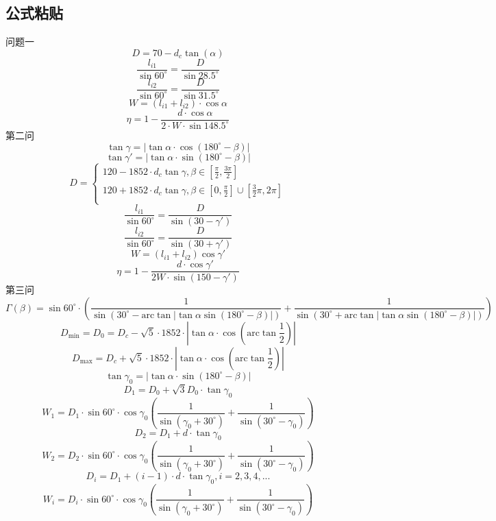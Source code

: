 \documentclass[withoutpreface,bwprint]{cumcmthesis} %
\begin{document}
\subsection{公式粘贴}
问题一
$$
D=70-d_c\tan \left( \alpha \right) 
$$ 
$$
\frac{l_{i1}}{\sin 60^{\circ}}=\frac{D}{\sin 28.5^{\circ}}
$$ 
$$
\frac{l_{i2}}{\sin 60^{\circ}}=\frac{D}{\sin 31.5^{\circ}}
$$ 
$$
W=\left( l_{i1}+l_{i2} \right) \cdot \cos \alpha 
$$ 
$$
\eta =1-\frac{d\cdot \cos \alpha}{2\cdot W\cdot \sin 148.5^{\circ}}
$$ 
第二问
$$
\tan \gamma =\left| \tan \alpha \cdot \cos \left( 180^{\circ}-\beta \right) \right|
$$ 
$$
\tan \gamma \prime=\left| \tan \alpha \cdot \sin \left( 180^{\circ}-\beta \right) \right|
$$ 
$$
D=\begin{cases}
	120-1852\cdot d_c\tan \gamma , \beta \in \left[ \frac{\pi}{2},\frac{3\pi}{2} \right]\\
	120+1852\cdot d_c\tan \gamma , \beta \in \left[ 0,\frac{\pi}{2} \right] \cup \left[ \frac{3}{2}\pi ,2\pi \right]\\
\end{cases}
$$ 
$$
\frac{l_{i1}}{\sin 60^{\circ}}=\frac{D}{\sin \left( 30-\gamma \prime \right)}
$$ 
$$
\frac{l_{i2}}{\sin 60^{\circ}}=\frac{D}{\sin \left( 30+\gamma \prime \right)}
$$ 
$$
W=\left( l_{i1}+l_{i2} \right) \cos \gamma \prime
$$ 
$$
\eta =1-\frac{d\cdot \cos \gamma \prime}{2W\cdot \sin \left( 150-\gamma \prime \right)}
$$ 
第三问
$$
\varGamma \left( \beta \right) =\sin 60^{\circ}\cdot \left( \frac{1}{\sin \left( 30^{\circ}-\mathrm{arc}\tan \left| \tan \alpha \sin \left( 180^{\circ}-\beta \right) \right| \right)}+\frac{1}{\sin \left( 30^{\circ}+\mathrm{arc}\tan \left| \tan \alpha \sin \left( 180^{\circ}-\beta \right) \right| \right)} \right) 
$$
$$
D_{\min}=D_0=D_c-\sqrt{5}\cdot 1852\cdot \left| \tan \alpha \cdot \cos \left( \mathrm{arc}\tan \frac{1}{2} \right) \right|
$$
$$
D_{\max}=D_c+\sqrt{5}\cdot 1852\cdot \left| \tan \alpha \cdot \cos \left( \mathrm{arc}\tan \frac{1}{2} \right) \right|
$$
$$
\tan \gamma _0=\left| \tan \alpha \cdot \sin \left( 180^{\circ}-\beta \right) \right|
$$
$$
D_1=D_0+\sqrt{3}D_0\cdot \tan \gamma _0
$$
$$
W_1=D_1\cdot \sin 60^{\circ}\cdot \cos \gamma _0\left( \frac{1}{\sin \left( \gamma _0+30^{\circ} \right)}+\frac{1}{\sin \left( 30^{\circ}-\gamma _0 \right)} \right) 
$$
$$
D_2=D_1+d\cdot \tan \gamma _0
$$
$$
W_2=D_2\cdot \sin 60^{\circ}\cdot \cos \gamma _0\left( \frac{1}{\sin \left( \gamma _0+30^{\circ} \right)}+\frac{1}{\sin \left( 30^{\circ}-\gamma _0 \right)} \right) 
$$
$$
D_i=D_1+\left( i-1 \right) \cdot d\cdot \tan \gamma _0, i=2,3,4,...
$$
$$
W_i=D_i\cdot \sin 60^{\circ}\cdot \cos \gamma _0\left( \frac{1}{\sin \left( \gamma _0+30^{\circ} \right)}+\frac{1}{\sin \left( 30^{\circ}-\gamma _0 \right)} \right) 
$$
\end{document}
